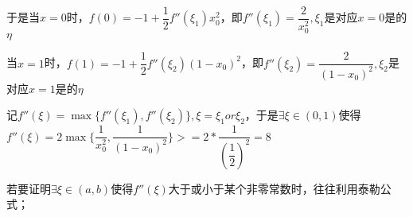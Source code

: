 于是当\(x = 0\)时，\(f(0) = -1 + \dfrac{1}{2}f''(\xi_1)x_0^2\)，即\(f''(\xi_1) = \dfrac{2}{x_0^2}, \xi_1\)是对应\(x = 0\)是的\(\eta\)

当\(x = 1\)时，\(f(1) = -1 + \dfrac{1}{2}f''(\xi_2)(1 - x_0)^2\)，即\(f''(\xi_2) = \dfrac{2}{(1 - x_0)^2}, \xi_2\)是对应\(x = 1\)是的\(\eta\)

记\(f''(\xi) = \max\{f''(\xi_1), f''(\xi_2)\}, \xi = \xi_1 or \xi_2\)，于是\(\exists \xi \in (0, 1)\)使得\(f''(\xi) = 2\max\{\dfrac{1}{x_0^2}, \dfrac{1}{(1 - x_0)^2}\} >= 2 * \dfrac{1}{(\dfrac{1}{2})^2} = 8\)

若要证明\(\exists \xi \in (a, b)\)使得\(f''(\xi)\)大于或小于某个非零常数时，往往利用泰勒公式；













